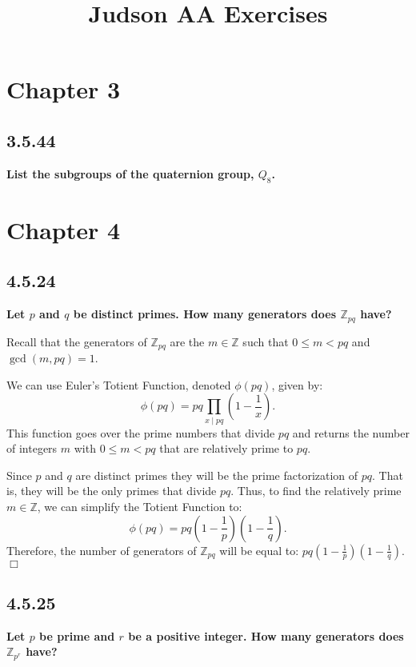 \documentclass[11pt, a4paper]{article}
\title{Judson AA Exercises}
\author{}
\date{}
\begin{document}
\maketitle 
\tableofcontents

\newpage
\section{Chapter 3}

\subsection{3.5.44}
\textbf{List the subgroups of the quaternion group, $Q_{8}$.}

\newpage
\section{Chapter 4}

\subsection{4.5.24}
\textbf{Let $p$ and $q$ be distinct primes. How many generators does $\mathbb{Z}_{pq}$ have?}

Recall that the generators of $\mathbb{Z}_{pq}$ are the $m \in \mathbb{Z}$ such that $0 \leq m < pq$ and $\gcd(m, pq) = 1$. 

We can use Euler's Totient Function, denoted $\phi(pq)$, given by:
\[
  \phi(pq) = pq \prod_{x \mid pq} \left ( 1 - \frac{1}{x} \right ).
\]
This function goes over the prime numbers that divide $pq$ and returns the number of integers $m$ with $0 \leq m < pq$ that are relatively prime to $pq$. 

Since $p$ and $q$ are distinct primes they will be the prime factorization of $pq$. That is, they will be the only primes that divide $pq$. Thus, to find the relatively prime $m \in \mathbb{Z}$, we can simplify the Totient Function to:
\[
  \phi(pq) = pq \left ( 1 - \frac{1}{p} \right ) \left ( 1 - \frac{1}{q} \right ).
\]
Therefore, the number of generators of $\mathbb{Z}_{pq}$ will be equal to: $pq \left ( 1 - \frac{1}{p} \right ) \left ( 1 - \frac{1}{q} \right )$. $\Box$

\subsection{4.5.25}
\textbf{Let $p$ be prime and $r$ be a positive integer. How many generators does $\mathbb{Z}_{p^r}$ have?}
\end{document}
